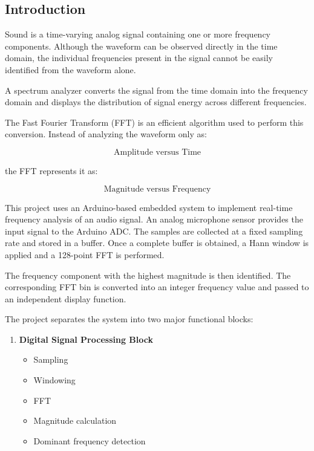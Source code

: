 \documentclass{article}
\begin{document}
\begin{center}

\section{Introduction}

Sound is a time-varying analog signal containing one or more frequency components. Although the waveform can be observed directly in the time domain, the individual frequencies present in the signal cannot be easily identified from the waveform alone.

A spectrum analyzer converts the signal from the time domain into the frequency domain and displays the distribution of signal energy across different frequencies.

The Fast Fourier Transform (FFT) is an efficient algorithm used to perform this conversion. Instead of analyzing the waveform only as:

\[
\text{Amplitude versus Time}
\]

the FFT represents it as:

\[
\text{Magnitude versus Frequency}
\]

This project uses an Arduino-based embedded system to implement real-time frequency analysis of an audio signal. An analog microphone sensor provides the input signal to the Arduino ADC. The samples are collected at a fixed sampling rate and stored in a buffer. Once a complete buffer is obtained, a Hann window is applied and a 128-point FFT is performed.

The frequency component with the highest magnitude is then identified. The corresponding FFT bin is converted into an integer frequency value and passed to an independent display function.

The project separates the system into two major functional blocks:

\begin{enumerate}
    \item \textbf{Digital Signal Processing Block}
    \begin{itemize}
        \item Sampling
        \item Windowing
        \item FFT
        \item Magnitude calculation
        \item Dominant frequency detection
    \end{itemize}


\end{enumerate}
\end{center}
\end{document}

